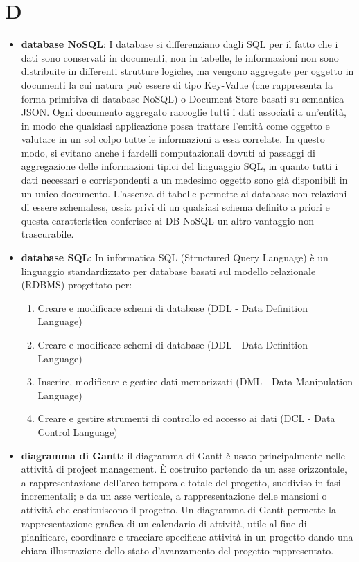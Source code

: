 \section{D}
\begin{itemize}
	\item \textbf{database NoSQL}: I database si differenziano dagli SQL per il fatto che i dati sono conservati in documenti, non in tabelle, le informazioni non sono distribuite in differenti strutture logiche, ma vengono aggregate per oggetto in documenti la cui natura può essere di tipo Key-Value (che rappresenta la forma primitiva di database NoSQL) o Document Store basati su semantica JSON. Ogni documento aggregato raccoglie tutti i dati associati a un’entità, in modo che qualsiasi applicazione possa trattare l’entità come oggetto e valutare in un sol colpo tutte le informazioni a essa correlate. In questo modo, si evitano anche i fardelli computazionali dovuti ai passaggi di aggregazione delle informazioni tipici del linguaggio SQL, in quanto tutti i dati necessari e corrispondenti a un medesimo oggetto sono già disponibili in un unico documento. L’assenza di tabelle permette ai database non relazioni di essere schemaless, ossia privi di un qualsiasi schema definito a priori e questa caratteristica conferisce ai DB NoSQL un altro vantaggio non trascurabile.
	\item \textbf{database SQL}: In informatica SQL (Structured Query Language) è un linguaggio standardizzato per database basati sul modello relazionale (RDBMS) progettato per:
	\begin{enumerate}  
		\item Creare e modificare schemi di database (DDL - Data Definition Language) 
		\item Creare e modificare schemi di database (DDL - Data Definition Language) 
		\item Inserire, modificare e gestire dati memorizzati (DML - Data Manipulation Language)
		\item Creare e gestire strumenti di controllo ed accesso ai dati (DCL - Data Control Language)
	\end{enumerate}
	\item \textbf{diagramma di Gantt}: il diagramma di Gantt è usato principalmente nelle attività di project management. \MakeUppercase{è} costruito partendo da un asse orizzontale, a rappresentazione dell'arco temporale totale del progetto, suddiviso in fasi incrementali; e da un asse verticale, a rappresentazione delle mansioni o attività che costituiscono il progetto. Un diagramma di Gantt permette la rappresentazione grafica di un calendario di attività, utile al fine di pianificare, coordinare e tracciare specifiche attività in un progetto dando una chiara illustrazione dello stato d'avanzamento del progetto rappresentato.

\end{itemize}
